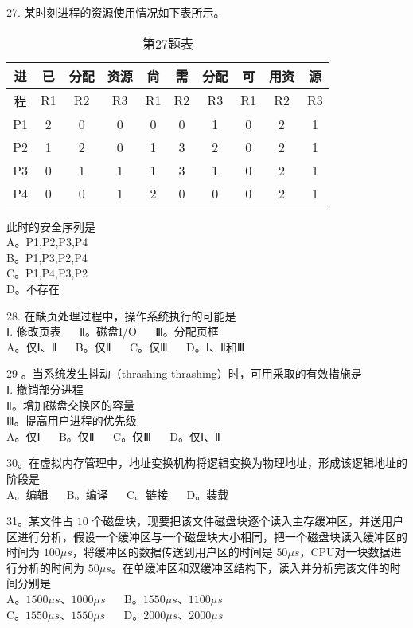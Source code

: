 27. 某时刻进程的资源使用情况如下表所示。 \\
\begin{table}[ht]
\centering
\caption{第27题表}\label{tab_Na11_2}
\begin{tabular}{|c|c|c|c|c|c|c|c|c|c|}
\hline
进 & 已 & 分配 & 资源 & 尙 & 需 & 分配 & 可 & 用资 & 源 \\
\hline
程 & R1 & R2 & R3 & R1 & R2 & R3 & R1 & R2 & R3 \\
\hline
P1 & 2 & 0 & 0 & 0 & 0 & 1 & 0 & 2 & 1 \\
\hline
P2 & 1 & 2 & 0 & 1 & 3 & 2 & 0 & 2 & 1 \\
\hline
P3 & 0 & 1 & 1 & 1 & 3 & 1 & 0 & 2 & 1 \\
\hline
P4 & 0 & 0 & 1 & 2 & 0 & 0 & 0 & 2 & 1 \\
\hline
\end{tabular}
\end{table}

此时的安全序列是 \\
A。P1,P2,P3,P4 \\
B。P1,P3,P2,P4 \\
C。P1,P4,P3,P2 \\
D。不存在


28. 在缺页处理过程中，操作系统执行的可能是 \\
Ⅰ. 修改页表 $\quad$ Ⅱ。磁盘I/O $\quad$ Ⅲ。分配页框 \\
A。仅Ⅰ、Ⅱ $\quad$ B。仅Ⅱ $\quad$ C。仅Ⅲ $\quad$ D。Ⅰ、Ⅱ和Ⅲ

29 。当系统发生抖动（thrashing thrashing）时，可用采取的有效措施是 \\
Ⅰ. 撤销部分进程 \\
Ⅱ。增加磁盘交换区的容量 \\
Ⅲ。提高用户进程的优先级 \\
A。仅Ⅰ $\quad$ B。仅Ⅱ $\quad$ C。仅Ⅲ $\quad$ D。仅Ⅰ、Ⅱ

30。在虚拟内存管理中，地址变换机构将逻辑变换为物理地址，形成该逻辑地址的阶段是 \\
A。编辑 $\quad$ B。编译 $\quad$ C。链接 $\quad$ D。装载

31。某文件占 $10$ 个磁盘块，现要把该文件磁盘块逐个读入主存缓冲区，并送用户区进行分析，假设一个缓冲区与一个磁盘块大小相同，把一个磁盘块读入缓冲区的时间为 $100\mu s$，将缓冲区的数据传送到用户区的时间是 $50\mu s$，CPU对一块数据进行分析的时间为 $50\mu s$。在单缓冲区和双缓冲区结构下，读入并分析完该文件的时间分别是 \\
A。$1500\mu s$、$1000\mu s$ $\quad$ B。$1550\mu s$、$1100\mu s$ \\
C。$1550\mu s$、$1550\mu s$ $\quad$ D。$2000\mu s$、$2000\mu s$

